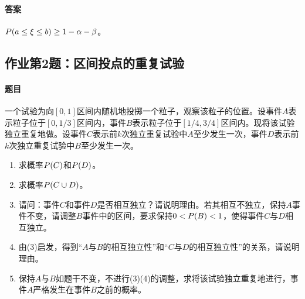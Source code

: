 \paragraph{答案}$\P(a\leq\xi\leq b)\geq1-\alpha-\beta$。

\subsection{作业第2题：区间投点的重复试验}
\label{ex:w05-h2}
\paragraph{题目}
一个试验为向$[0,1]$区间内随机地投掷一个粒子，观察该粒子的位置。设事件$A$表示粒子位于$[0,1/3]$区间内，事件$B$表示粒子位于$[1/4,3/4]$区间内。现将该试验独立重复地做。设事件$C$表示前$k$次独立重复试验中$A$至少发生一次，事件$D$表示前$k$次独立重复试验中$B$至少发生一次。
\begin{enumerate}
\item 求概率$\P(C)$和$\P(D)$。
\item 求概率$\P(C\cup D)$。
\item 请问：事件$C$和事件$D$是否相互独立？请说明理由。若其相互不独立，保持$A$事件不变，请调整$B$事件中的区间，要求保持$0<\P(B)<1$，使得事件$C$与$D$相互独立。
\item 由(3)启发，得到“$A$与$B$的相互独立性”和“$C$与$D$的相互独立性”的关系，请说明理由。
\item 保持$A$与$B$如题干不变，不进行(3)(4)的调整，求将该试验独立重复地进行，事件$A$严格发生在事件$B$之前的概率。
\end{enumerate}

